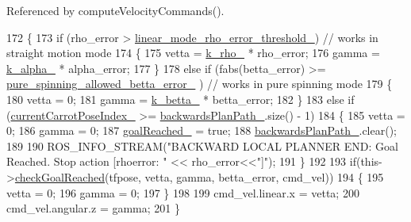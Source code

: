 Referenced by compute\+Velocity\+Commands().


\begin{DoxyCode}
172         \{
173             \textcolor{keywordflow}{if} (rho\_error > \hyperlink{classcl__move__base__z_1_1backward__local__planner_1_1BackwardLocalPlanner_a858efacf597a3a35c97aec9ca53e5900}{linear\_mode\_rho\_error\_threshold\_}) \textcolor{comment}{// works in
       straight motion mode}
174             \{
175                 vetta = \hyperlink{classcl__move__base__z_1_1backward__local__planner_1_1BackwardLocalPlanner_ad8a36184bfb011545c751109e23d3b98}{k\_rho\_} * rho\_error;
176                 gamma = \hyperlink{classcl__move__base__z_1_1backward__local__planner_1_1BackwardLocalPlanner_abf7a5a56de2ee41afba7e63c0628ec35}{k\_alpha\_} * alpha\_error;
177             \}
178             \textcolor{keywordflow}{else} \textcolor{keywordflow}{if} (fabs(betta\_error) >= \hyperlink{classcl__move__base__z_1_1backward__local__planner_1_1BackwardLocalPlanner_a957d163366cfeaf20d5534a7208fc326}{pure\_spinning\_allowed\_betta\_error\_}
      ) \textcolor{comment}{// works in pure spinning mode}
179             \{
180                 vetta = 0;
181                 gamma = \hyperlink{classcl__move__base__z_1_1backward__local__planner_1_1BackwardLocalPlanner_a9f257183d87f1d732cb7e404f09905ad}{k\_betta\_} * betta\_error;
182             \}
183             \textcolor{keywordflow}{else} \textcolor{keywordflow}{if} (\hyperlink{classcl__move__base__z_1_1backward__local__planner_1_1BackwardLocalPlanner_a2e8f2b78bc97f27c5fa431f3af2261ed}{currentCarrotPoseIndex\_} >= 
      \hyperlink{classcl__move__base__z_1_1backward__local__planner_1_1BackwardLocalPlanner_ad9cde5c85f782cab2ddb4030e3c3f2cf}{backwardsPlanPath\_}.size() - 1)
184             \{
185                 vetta = 0;
186                 gamma = 0;
187                 \hyperlink{classcl__move__base__z_1_1backward__local__planner_1_1BackwardLocalPlanner_ad443c52ef585a8eab0364f0909222f51}{goalReached\_} = \textcolor{keyword}{true};
188                 \hyperlink{classcl__move__base__z_1_1backward__local__planner_1_1BackwardLocalPlanner_ad9cde5c85f782cab2ddb4030e3c3f2cf}{backwardsPlanPath\_}.clear();
189 
190                 ROS\_INFO\_STREAM(\textcolor{stringliteral}{"BACKWARD LOCAL PLANNER END: Goal Reached. Stop action [rhoerror: "} << 
      rho\_error<<\textcolor{stringliteral}{"]"});
191             \}
192 
193             \textcolor{keywordflow}{if}(this->\hyperlink{classcl__move__base__z_1_1backward__local__planner_1_1BackwardLocalPlanner_a6c4363e82119a6a8a5a3bfe309280898}{checkGoalReached}(tfpose, vetta, gamma, betta\_error, cmd\_vel))
194             \{            
195                 vetta = 0;
196                 gamma = 0;
197             \}
198 
199             cmd\_vel.linear.x = vetta;
200             cmd\_vel.angular.z = gamma;
201         \}
\end{DoxyCode}
